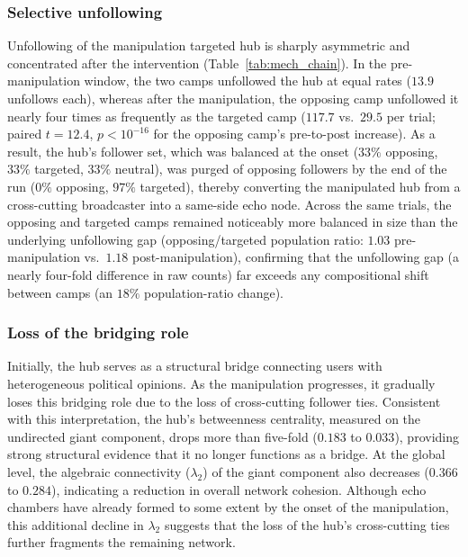\documentclass[pdflatex,sn-mathphys-num]{sn-jnl}%
\theoremstyle{thmstyleone}%
\theoremstyle{thmstyletwo}%
\theoremstyle{thmstylethree}%
\begin{document}
\subsubsection{Selective unfollowing}\label{sec:selective_unfollowing}
Unfollowing of the manipulation targeted hub is sharply asymmetric and concentrated after the
intervention (Table~\ref{tab:mech_chain}). In the pre-manipulation window, the two
camps unfollowed the hub at equal rates ($13.9$ unfollows each), whereas after the manipulation,
the opposing camp unfollowed it nearly four times as frequently as the targeted camp
($117.7$ vs.\ $29.5$ per trial; paired $t = 12.4$, $p < 10^{-16}$ for the
opposing camp's pre-to-post increase). As a result, the hub's follower
set, which was balanced at the onset ($33\%$ opposing, $33\%$ targeted, $33\%$ neutral),
was purged of opposing followers by the end of the run ($0\%$ opposing, $97\%$
targeted), thereby converting the manipulated hub from a cross-cutting broadcaster into
a same-side echo node.
Across the same trials, the opposing and targeted camps remained noticeably more
balanced in size than the underlying unfollowing gap (opposing/targeted population ratio:
$1.03$ pre-manipulation vs.\ $1.18$ post-manipulation), confirming that the unfollowing
gap (a nearly four-fold difference in raw counts) far exceeds any compositional shift
between camps (an $18\%$ population-ratio change).
\par

\subsubsection{Loss of the bridging role}
Initially, the hub serves as a structural bridge connecting users with heterogeneous political opinions.
As the manipulation progresses, it gradually loses this bridging role due to the loss of cross-cutting
follower ties. Consistent with this interpretation, the hub's betweenness centrality,
measured on the undirected giant component, drops more than five-fold
($0.183$ to $0.033$), providing strong structural evidence that it no longer functions
as a bridge. At the global level, the algebraic connectivity ($\lambda_2$) of the giant
component also decreases ($0.366$ to $0.284$), indicating a reduction in
overall network cohesion. Although echo chambers have already formed to some extent by
the onset of the manipulation, this additional decline in $\lambda_2$ suggests that the loss
of the hub's cross-cutting ties further fragments the remaining network.
\par
\end{document}
